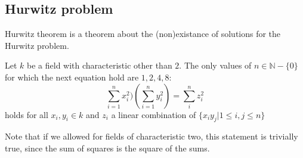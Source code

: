 \documentclass[../Thesis.tex]{subfiles}
\begin{document}
\subsection{Hurwitz problem}
Hurwitz theorem is a theorem about the (non)existance of solutions for the Hurwitz problem.
\begin{theorem}
Let $k$ be a field with characteristic other than $2$. The only values of $n \in \mathbb{N}-\{0\}$ for which the next equation hold are $1,2,4,8$:
\begin{equation}
\sum_{i = 1}^nx^2_i)(\sum_{i=1}^ny_i^2) = \sum_i^n z_i^2
\end{equation}
holds for all $x_i, y_i \in k$ and $z_i$ a linear combination of $\{x_iy_j|1 \leq i,j \leq n \}$
\end{theorem}
Note that if we allowed for fields of characteristic two, this statement is trivially true, since the sum of squares is the square of the sums.
\end{document}
